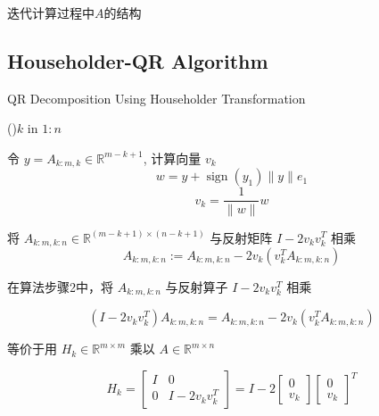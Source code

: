 \begin{FigureCenter}{迭代计算过程中$A$的结构}
\end{FigureCenter}

\subsection{Householder-QR Algorithm}

\begin{algorithm}[htbp]
    \caption{QR Decomposition Using Householder Transformation}

    \For(){$k$ in $1:n$}{
        令 $ y=A_{k: m, k} \in \mathbb{R}^{m-k+1} $, 计算向量 $ v_{k} $
    $$ w=y+\operatorname{sign}\left(y_{1}\right)\|y\| e_{1}$$
    $$ v_{k}=\frac{1}{\|w\|} w $$\;

    将 $ A_{k: m, k: n} \in \mathbb{R}^{(m-k+1) \times(n-k+1)} $ 与反射矩阵 $ I-2 v_{k} v_{k}^{T} $ 相乘
    $$ A_{k: m, k: n}:=A_{k: m, k: n}-2 v_{k}\left(v_{k}^{T} A_{k: m, k: n}\right) $$\;
    }
\end{algorithm}

\begin{theorem}
     在算法步骤2中，将 $ A_{k: m, k: n} $ 与反射算子 $ I-2 v_{k} v_{k}^{T} $ 相乘

    $$ \left(I-2 v_{k} v_{k}^{T}\right) A_{k: m, k: n}=A_{k: m, k: n}-2 v_{k}\left(v_{k}^{T} A_{k: m, k: n}\right) $$

    等价于用 $ H_{k} \in \mathbb{R}^{m \times m} $ 乘以 $ A \in \mathbb{R}^{m \times n}  $

    $$ H_{k}=\left[\begin{array}{cc}I & 0 \\ 0 & I-2 v_{k} v_{k}^{T}\end{array}\right]=I-2\left[\begin{array}{c}0 \\ v_{k}\end{array}\right]\left[\begin{array}{l}0 \\ v_{k}\end{array}\right]^{T} $$
\end{theorem}

